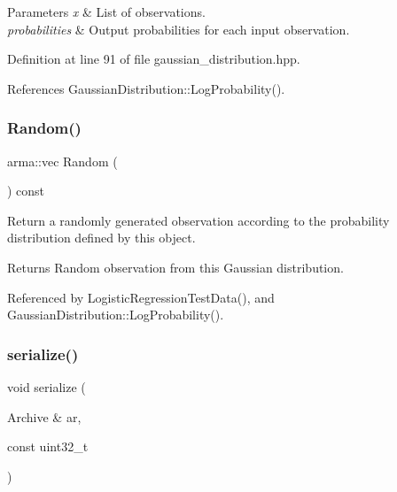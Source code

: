 \begin{DoxyParams}{Parameters}
{\em x} & List of observations. \\
\hline
{\em probabilities} & Output probabilities for each input observation. \\
\hline
\end{DoxyParams}


Definition at line 91 of file gaussian\+\_\+distribution.\+hpp.



References Gaussian\+Distribution\+::\+Log\+Probability().

\mbox{\label{classmlpack_1_1distribution_1_1GaussianDistribution_a2c6f8d5bb4eacf7de767d2172b320756}} 
\subsubsection{Random()}
{\footnotesize\ttfamily arma\+::vec Random (\begin{DoxyParamCaption}{ }\end{DoxyParamCaption}) const}



Return a randomly generated observation according to the probability distribution defined by this object. 

\begin{DoxyReturn}{Returns}
Random observation from this Gaussian distribution. 
\end{DoxyReturn}


Referenced by Logistic\+Regression\+Test\+Data(), and Gaussian\+Distribution\+::\+Log\+Probability().

\mbox{\label{classmlpack_1_1distribution_1_1GaussianDistribution_a65cba07328997659bec80b9879b15a51}} 
\subsubsection{serialize()}
{\footnotesize\ttfamily void serialize (\begin{DoxyParamCaption}\item[{Archive \&}]{ar,  }\item[{const uint32\+\_\+t}]{ }\end{DoxyParamCaption})\hspace{0.3cm}{\ttfamily [inline]}}



